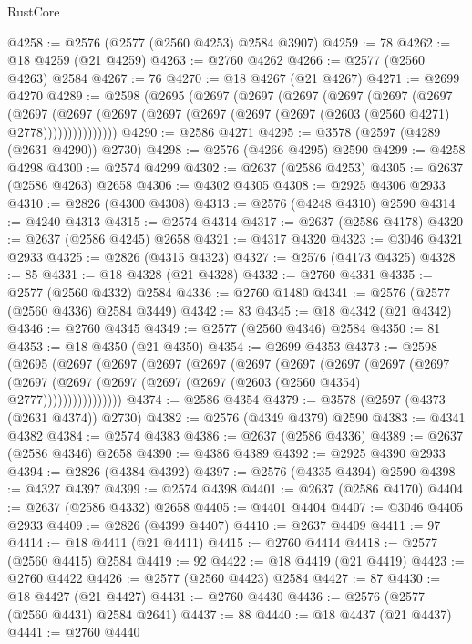 \begin{lexlean}{RustCore}
\begin{coremodule}
@4258 := @2576 (@2577 (@2560 @4253) @2584 @3907)
@4259 := 78
@4262 := @18 @4259 (@21 @4259)
@4263 := @2760 @4262
@4266 := @2577 (@2560 @4263) @2584
@4267 := 76
@4270 := @18 @4267 (@21 @4267)
@4271 := @2699 @4270
@4289 := @2598
    (@2695
      (@2697
        (@2697
          (@2697
            (@2697
              (@2697
                (@2697
                  (@2697
                    (@2697
                      (@2697 (@2697 (@2697 (@2697 (@2697 (@2603 (@2560 @4271) @2778)))))))))))))))
@4290 := @2586 @4271
@4295 := @3578 (@2597 (@4289 (@2631 @4290)) @2730)
@4298 := @2576 (@4266 @4295) @2590
@4299 := @4258 @4298
@4300 := @2574 @4299
@4302 := @2637 (@2586 @4253)
@4305 := @2637 (@2586 @4263) @2658
@4306 := @4302 @4305
@4308 := @2925 @4306 @2933
@4310 := @2826 (@4300 @4308)
@4313 := @2576 (@4248 @4310) @2590
@4314 := @4240 @4313
@4315 := @2574 @4314
@4317 := @2637 (@2586 @4178)
@4320 := @2637 (@2586 @4245) @2658
@4321 := @4317 @4320
@4323 := @3046 @4321 @2933
@4325 := @2826 (@4315 @4323)
@4327 := @2576 (@4173 @4325)
@4328 := 85
@4331 := @18 @4328 (@21 @4328)
@4332 := @2760 @4331
@4335 := @2577 (@2560 @4332) @2584
@4336 := @2760 @1480
@4341 := @2576 (@2577 (@2560 @4336) @2584 @3449)
@4342 := 83
@4345 := @18 @4342 (@21 @4342)
@4346 := @2760 @4345
@4349 := @2577 (@2560 @4346) @2584
@4350 := 81
@4353 := @18 @4350 (@21 @4350)
@4354 := @2699 @4353
@4373 := @2598
    (@2695
      (@2697
        (@2697
          (@2697
            (@2697
              (@2697
                (@2697
                  (@2697
                    (@2697
                      (@2697
                        (@2697
                          (@2697 (@2697 (@2697 (@2697 (@2603 (@2560 @4354) @2777))))))))))))))))
@4374 := @2586 @4354
@4379 := @3578 (@2597 (@4373 (@2631 @4374)) @2730)
@4382 := @2576 (@4349 @4379) @2590
@4383 := @4341 @4382
@4384 := @2574 @4383
@4386 := @2637 (@2586 @4336)
@4389 := @2637 (@2586 @4346) @2658
@4390 := @4386 @4389
@4392 := @2925 @4390 @2933
@4394 := @2826 (@4384 @4392)
@4397 := @2576 (@4335 @4394) @2590
@4398 := @4327 @4397
@4399 := @2574 @4398
@4401 := @2637 (@2586 @4170)
@4404 := @2637 (@2586 @4332) @2658
@4405 := @4401 @4404
@4407 := @3046 @4405 @2933
@4409 := @2826 (@4399 @4407)
@4410 := @2637 @4409
@4411 := 97
@4414 := @18 @4411 (@21 @4411)
@4415 := @2760 @4414
@4418 := @2577 (@2560 @4415) @2584
@4419 := 92
@4422 := @18 @4419 (@21 @4419)
@4423 := @2760 @4422
@4426 := @2577 (@2560 @4423) @2584
@4427 := 87
@4430 := @18 @4427 (@21 @4427)
@4431 := @2760 @4430
@4436 := @2576 (@2577 (@2560 @4431) @2584 @2641)
@4437 := 88
@4440 := @18 @4437 (@21 @4437)
@4441 := @2760 @4440

\end{coremodule}
\end{lexlean}
